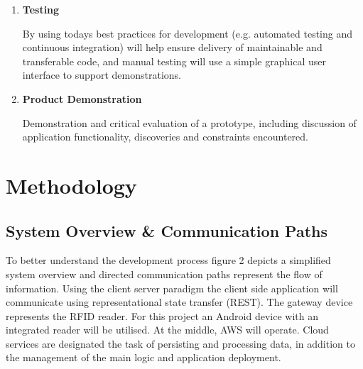 \documentclass[a4paper, 11pt]{article}
\begin{document}
\begin{enumerate}
  \item \textbf{Testing}
   	\begin{flushleft}By using todays best practices for development (e.g. automated testing and continuous integration) will help ensure delivery of maintainable and transferable code, and manual testing will use a simple graphical user interface to support demonstrations. 
 	\end{flushleft}
 
 \item \textbf{Product Demonstration}
 	\begin{flushleft}Demonstration and critical evaluation of a prototype, including discussion of application functionality, discoveries and constraints encountered. 
 	\end{flushleft}
\end{enumerate}
\clearpage







\section{Methodology}

\subsection{System Overview \& Communication Paths}

To better understand the development process figure 2 depicts a simplified system overview and directed communication paths represent the flow of information. Using the client server paradigm the client side application will communicate using representational state transfer (REST)\cite{REST}. The gateway device represents the RFID reader. For this project an Android device with an integrated reader will be utilised. At the middle, AWS will operate. Cloud services are designated the task of persisting and processing data, in addition to the management of the main logic and application deployment. 
\end{document}
